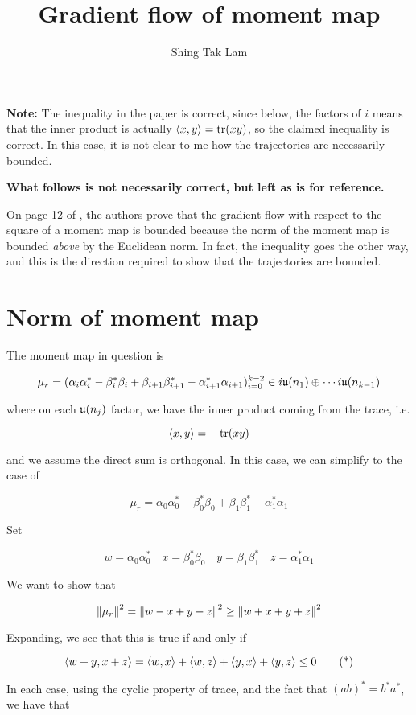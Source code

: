 \documentclass{article}
\title{Gradient flow of moment map}
\author{Shing Tak Lam}
\begin{document}
\maketitle

\textbf{Note:} The inequality in the paper is correct, since below, the factors of \(i\) means that the inner product is actually \(\left\langle x, y \right\rangle = \tr(xy)\), so the claimed inequality is correct. In this case, it is not clear to me how the trajectories are necessarily bounded.

\textbf{What follows is not necessarily correct, but left as is for reference.}

On page 12 of \cite{kobak_classical_1996}, the authors prove that the gradient flow with respect to the square of a moment map is bounded because the norm of the moment map is bounded \emph{above} by the Euclidean norm. In fact, the inequality goes the other way, and this is the direction required to show that the trajectories are bounded.

\section{Norm of moment map}

The moment map in question is

\[\mu_r = (\alpha_i\alpha_i^* - \beta_i^*\beta_i + \beta_{i+1}\beta_{i+1}^* - \alpha_{i+1}^*\alpha_{i+1})_{i=0}^{k-2} \in i\mathfrak{u}(n_1) \oplus \cdots i\mathfrak{u}(n_{k-1})\]

where on each \(\mathfrak{u}(n_j)\) factor, we have the inner product coming from the trace, i.e.

\[\left\langle x, y \right\rangle = -\tr(xy)\]

and we assume the direct sum is orthogonal. In this case, we can simplify to the case of

\[\mu_r = \alpha_0\alpha_0^* - \beta_0^*\beta_0 + \beta_1\beta_1^* -\alpha_1^*\alpha_1\]

Set

\[w = \alpha_0\alpha_0^* \quad x = \beta_0^*\beta_0 \quad y = \beta_1\beta_1^* \quad z = \alpha_1^*\alpha_1 \]

We want to show that

\[\norm{\mu_r}^2 = \norm{w-x+y-z}^2 \ge \norm{w+x+y+z}^2\]

Expanding, we see that this is true if and only if

\[\left\langle w+y, x + z \right\rangle = \left\langle w, x \right\rangle + \left\langle w, z \right\rangle + \left\langle y, x \right\rangle + \left\langle y, z \right\rangle \le 0 \tag{*}\]

In each case, using the cyclic property of trace, and the fact that \((ab)^* = b^*a^*\), we have that
\end{document}
